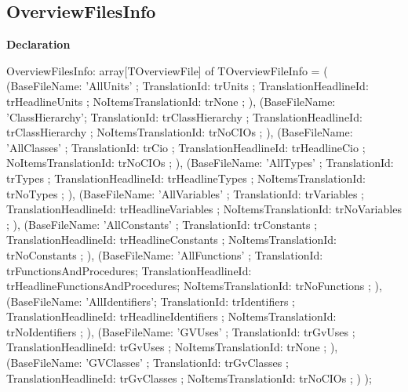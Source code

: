 \documentclass{report}
\newif\ifpdf
\begin{document}
\subsection*{OverviewFilesInfo}
\fi
\label{PasDoc_Gen-OverviewFilesInfo}
\begin{list}{}{
\setlength{\itemindent}{0cm}
\setlength{\listparindent}{0cm}
\setlength{\leftmargin}{\evensidemargin}
\addtolength{\leftmargin}{\tmplength}
\settowidth{\labelsep}{X}
\addtolength{\leftmargin}{\labelsep}
\setlength{\labelwidth}{\tmplength}
}
\item[\textbf{Declaration}\hfill]
\ifpdf
\begin{flushleft}
\fi
\begin{ttfamily}
OverviewFilesInfo: array[TOverviewFile] of TOverviewFileInfo = (
    (BaseFileName: 'AllUnits'      ; TranslationId: trUnits                 ; TranslationHeadlineId: trHeadlineUnits                 ; NoItemsTranslationId: trNone   ; ),
    (BaseFileName: 'ClassHierarchy'; TranslationId: trClassHierarchy        ; TranslationHeadlineId: trClassHierarchy ; NoItemsTranslationId: trNoCIOs           ; ),
    (BaseFileName: 'AllClasses'    ; TranslationId: trCio                   ; TranslationHeadlineId: trHeadlineCio                   ; NoItemsTranslationId: trNoCIOs           ; ),
    (BaseFileName: 'AllTypes'      ; TranslationId: trTypes                 ; TranslationHeadlineId: trHeadlineTypes                 ; NoItemsTranslationId: trNoTypes          ; ),
    (BaseFileName: 'AllVariables'  ; TranslationId: trVariables             ; TranslationHeadlineId: trHeadlineVariables             ; NoItemsTranslationId: trNoVariables      ; ),
    (BaseFileName: 'AllConstants'  ; TranslationId: trConstants             ; TranslationHeadlineId: trHeadlineConstants             ; NoItemsTranslationId: trNoConstants      ; ),
    (BaseFileName: 'AllFunctions'  ; TranslationId: trFunctionsAndProcedures; TranslationHeadlineId: trHeadlineFunctionsAndProcedures; NoItemsTranslationId: trNoFunctions      ; ),
    (BaseFileName: 'AllIdentifiers'; TranslationId: trIdentifiers           ; TranslationHeadlineId: trHeadlineIdentifiers           ; NoItemsTranslationId: trNoIdentifiers    ; ),
    (BaseFileName: 'GVUses'        ; TranslationId: trGvUses                ; TranslationHeadlineId: trGvUses         ; NoItemsTranslationId: trNone   ; ),
    (BaseFileName: 'GVClasses'     ; TranslationId: trGvClasses             ; TranslationHeadlineId: trGvClasses      ; NoItemsTranslationId: trNoCIOs ; )
  );\end{ttfamily}

\ifpdf
\end{flushleft}
\fi

\end{list}
\ifpdf
\end{document}

